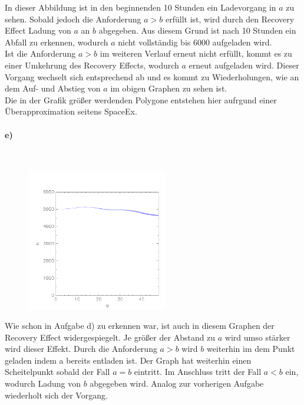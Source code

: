 In dieser Abbildung ist in den beginnenden 10 Stunden ein Ladevorgang in $a$ zu sehen. Sobald jedoch die Anforderung $a>b$ erfüllt ist, wird durch den Recovery Effect Ladung von $a$ an $b$ abgegeben. Aus diesem Grund ist nach 10 Stunden ein Abfall zu erkennen, wodurch $a$ nicht vollständig bis 6000 aufgeladen wird. \\


Ist die Anforderung $a>b$ im weiteren Verlauf erneut nicht erfüllt, kommt es zu einer Umkehrung des Recovery Effects, wodurch $a$ erneut aufgeladen wird. Dieser Vorgang wechselt sich entsprechend ab und es kommt zu Wiederholungen, wie an dem Auf- und Abstieg von $a$ im obigen Graphen zu sehen ist. \\


Die in der Grafik größer werdenden Polygone entstehen hier aufrgund einer Überapproximation seitens SpaceEx.


\paragraph{e)}\mbox{} \\

\begin{figure}[H]
	\centering
	\includegraphics[width=0.55\textwidth]{Aufgabe_e).png}
\end{figure}

Wie schon in Aufgabe d) zu erkennen war, ist auch in diesem Graphen der Recovery Effect widergespiegelt. Je größer der Abstand zu $a$ wird umso stärker wird dieser Effekt. Durch die Anforderung $a>b$ wird $b$ weiterhin im dem Punkt geladen indem a bereits entladen ist. Der Graph hat weiterhin einen Scheitelpunkt sobald der Fall $a=b$ eintritt. Im Anschluss tritt der Fall $a<b$ ein, wodurch Ladung von $b$ abgegeben wird. Analog zur vorherigen Aufgabe wiederholt sich der Vorgang. 


